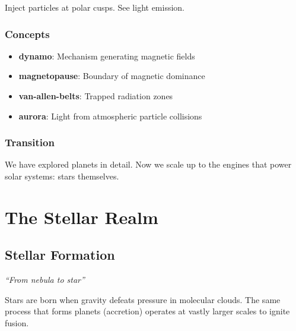 \documentclass[
  11pt,
  letterpaper,
  twoside,
  openright]{book}
\providecommand{\tightlist}{%
  \setlength{\itemsep}{0pt}\setlength{\parskip}{0pt}}
\begin{document}
Inject particles at polar cusps. See light emission.

\section{Concepts}\label{concepts-18}

\begin{itemize}
\tightlist
\item
  \textbf{dynamo}: Mechanism generating magnetic fields
\item
  \textbf{magnetopause}: Boundary of magnetic dominance
\item
  \textbf{van-allen-belts}: Trapped radiation zones
\item
  \textbf{aurora}: Light from atmospheric particle collisions
\end{itemize}

\section{Transition}\label{transition-18}

We have explored planets in detail. Now we scale up to the engines that
power solar systems: stars themselves.

\part{The Stellar Realm}

\chapter{Stellar Formation}\label{sec-stellar-formation}

\emph{``From nebula to star''}

\begin{tcolorbox}[enhanced jigsaw, leftrule=.75mm, title=\textcolor{quarto-callout-note-color}{\faInfo}\hspace{0.5em}{Key Revelation}, bottomrule=.15mm, opacityback=0, coltitle=black, arc=.35mm, colframe=quarto-callout-note-color-frame, colbacktitle=quarto-callout-note-color!10!white, colback=white, titlerule=0mm, breakable, bottomtitle=1mm, toptitle=1mm, rightrule=.15mm, toprule=.15mm, left=2mm, opacitybacktitle=0.6]

Stars are born when gravity defeats pressure in molecular clouds. The
same process that forms planets (accretion) operates at vastly larger
scales to ignite fusion.

\end{tcolorbox}
\end{document}

